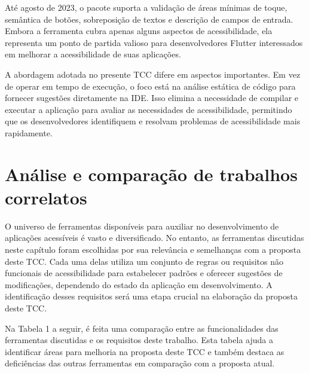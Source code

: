 Até agosto de 2023, o pacote suporta a validação de áreas mínimas de toque, semântica de botões, sobreposição de textos e descrição de campos de entrada. Embora a ferramenta cubra apenas alguns aspectos de acessibilidade, ela representa um ponto de partida valioso para desenvolvedores Flutter interessados em melhorar a acessibilidade de suas aplicações.

A abordagem adotada no presente TCC difere em aspectos importantes. Em vez de operar em tempo de execução, o foco está na análise estática de código para fornecer sugestões diretamente na IDE. Isso elimina a necessidade de compilar e executar a aplicação para avaliar as necessidades de acessibilidade, permitindo que os desenvolvedores identifiquem e resolvam problemas de acessibilidade mais rapidamente.

\section{Análise e comparação de trabalhos correlatos}

O universo de ferramentas disponíveis para auxiliar no desenvolvimento de aplicações acessíveis é vasto e diversificado. No entanto, as ferramentas discutidas neste capítulo foram escolhidas por sua relevância e semelhanças com a proposta deste TCC. Cada uma delas utiliza um conjunto de regras ou requisitos não funcionais de acessibilidade para estabelecer padrões e oferecer sugestões de modificações, dependendo do estado da aplicação em desenvolvimento. A identificação desses requisitos será uma etapa crucial na elaboração da proposta deste TCC.

Na Tabela 1 a seguir, é feita uma comparação entre as funcionalidades das ferramentas discutidas e os requisitos deste trabalho. Esta tabela ajuda a identificar áreas para melhoria na proposta deste TCC e também destaca as deficiências das outras ferramentas em comparação com a proposta atual.

